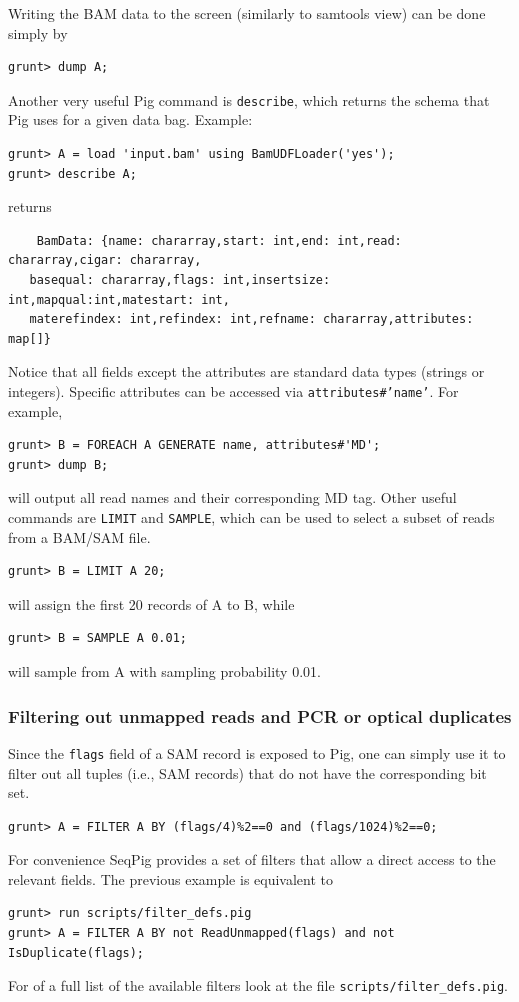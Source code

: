 Writing the BAM data to the screen (similarly to samtools view)
can be done simply by
\begin{lstlisting}
grunt> dump A;
\end{lstlisting}
Another very useful Pig command is {\tt describe}, which returns the schema that Pig
uses for a given data bag. Example:
\begin{lstlisting}
grunt> A = load 'input.bam' using BamUDFLoader('yes');
grunt> describe A;
\end{lstlisting}
returns
\begin{lstlisting}  
	BamData: {name: chararray,start: int,end: int,read: chararray,cigar: chararray,
   basequal: chararray,flags: int,insertsize: int,mapqual:int,matestart: int,
   materefindex: int,refindex: int,refname: chararray,attributes: map[]}
\end{lstlisting}
Notice that all fields except the attributes are standard data types (strings
or integers). Specific attributes can be accessed via {\tt attributes\#'name'}. For
example,
\begin{lstlisting} 
grunt> B = FOREACH A GENERATE name, attributes#'MD';
grunt> dump B;
\end{lstlisting}
will output all read names and their corresponding MD tag.
Other useful commands are {\tt LIMIT} and {\tt SAMPLE}, which can be used to
select a subset of reads from a BAM/SAM file.
\begin{lstlisting} 
grunt> B = LIMIT A 20;
\end{lstlisting}
will assign the first 20 records of A to B, while
\begin{lstlisting}
grunt> B = SAMPLE A 0.01;
\end{lstlisting}
will sample from A with sampling probability 0.01.

\subsubsection{Filtering out unmapped reads and PCR or optical duplicates}
Since the {\tt flags} field of a SAM record is exposed to Pig, one can simply
use it to filter out all tuples (i.e., SAM records) that do not have the
corresponding bit set.
\begin{lstlisting}
grunt> A = FILTER A BY (flags/4)%2==0 and (flags/1024)%2==0;
\end{lstlisting}
For convenience SeqPig provides a set of filters that allow a direct access
to the relevant fields. The previous example is equivalent to
\begin{lstlisting}
grunt> run scripts/filter_defs.pig
grunt> A = FILTER A BY not ReadUnmapped(flags) and not IsDuplicate(flags);
\end{lstlisting}
For of a full list of the available filters look at the file {\tt scripts/filter\_defs.pig}.

